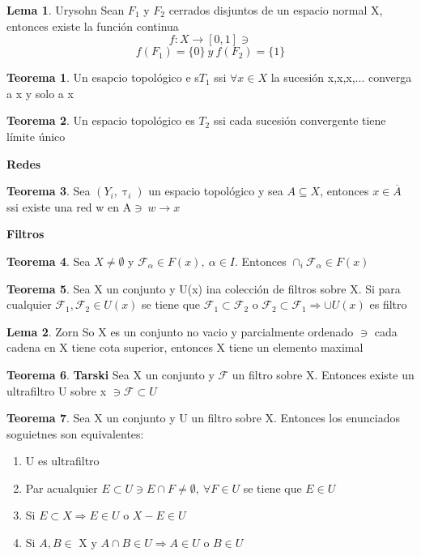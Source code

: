 \documentclass{article}
\theoremstyle{definition}
\newtheorem{theorem}{Teorema}[section]
\newtheorem{lemma}{Lema}[section]
\begin{document}

\begin{lemma}{Urysohn}
	Sean $F_1$ y $F_2$ cerrados disjuntos de un espacio normal X, entonces existe la función continua 
	\[f:X\to[0,1]\ni\]
	\[f(F_1)=\{0\}\ y \ f(F_2)=\{1\}\]
\end{lemma}


\begin{theorem}
	Un esapcio topológico e s$T_1$ ssi $\forall x\in X$ la sucesión x,x,x,... converga a x y solo a x
\end{theorem}


\begin{theorem}
	Un espacio topológico es $T_2$ ssi cada sucesión convergente tiene límite único
\end{theorem}
\textbf{Redes}
\begin{theorem}
	Sea $(Y_i,\uptau_i)$ un espacio topológico y sea $A\subseteq X$, entonces $x\in \overline{A}$ ssi existe una red w en A$\ni\ w\to x$
\end{theorem}
\textbf{Filtros}
\begin{theorem}

	Sea $X\neq\emptyset$ y $\mathcal{F}_{\alpha}\in F(x),\ \alpha\in I$. Entonces $\cap_i\mathcal{F}_{\alpha}\in F(x)$
\end{theorem}
\begin{theorem}
	Sea X un conjunto y U(x) ina colección de filtros sobre X. Si para cualquier $\mathcal{F}_1,\mathcal{F}_2\in U(x)$ se tiene que $\mathcal{F}_1\subset\mathcal{F}_2$ o $\mathcal{F}_2\subset\mathcal{F}_1\Rightarrow \cup U(x)$ es filtro
\end{theorem}
\begin{lemma}{Zorn}
	So X es un conjunto no vacio y parcialmente ordenado $\ni$ cada cadena en X tiene cota superior, entonces X tiene un elemento maximal
\end{lemma}
\begin{theorem}{\textbf{Tarski}}
	Sea X un conjunto y $\mathcal{F}$ un filtro sobre X. Entonces existe un ultrafiltro U sobre x $\ni \mathcal{F}\subset U$
\end{theorem}
\begin{theorem}
	Sea X un conjunto y U un filtro sobre X. Entonces los enunciados soguietnes son equivalentes:
	\begin{enumerate}
		\item U es ultrafiltro
		\item Par acualquier $E\subset U\ni E\cap F\neq \emptyset,\ \forall F\in U$ se tiene que $E\in U$
		\item Si $E\subset X\Rightarrow E\in U$ o $X-E\in U$
		\item Si $A, B\in$ X y $ A\cap B\in U\Rightarrow A\in U$ o $ B\in U$
	\end{enumerate}
\end{theorem}
\end{document}
